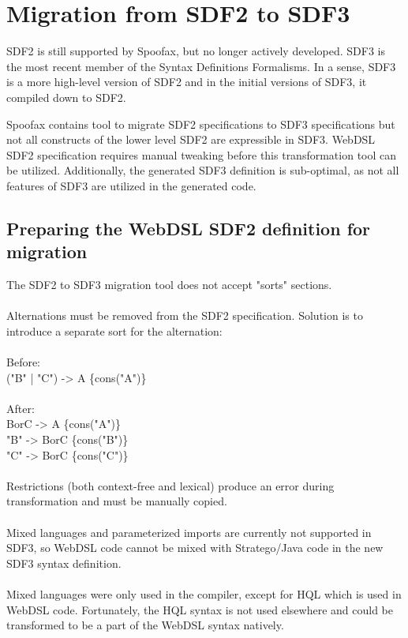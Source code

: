   \section{\label{sec:sdf2-to-sdf3}Migration from SDF2 to SDF3}

    SDF2 is still supported by Spoofax, but no longer actively developed. SDF3 is the most recent member of the Syntax Definitions Formalisms. In a sense, SDF3 is a more high-level version of SDF2 and in the initial versions of SDF3, it compiled down to SDF2.

    Spoofax contains tool to migrate SDF2 specifications to SDF3 specifications but not all constructs of the lower level SDF2 are expressible in SDF3. WebDSL SDF2 specification requires manual tweaking before this transformation tool can be utilized. Additionally, the generated SDF3 definition is sub-optimal, as not all features of SDF3 are utilized in the generated code.

    \subsection{\label{subsec:preparing-webdsl-sdf2}Preparing the WebDSL SDF2 definition for migration}

      The SDF2 to SDF3 migration tool does not accept "sorts" sections.
      \\\\Alternations must be removed from the SDF2 specification. Solution is to introduce a separate sort for the alternation:
      \\\\Before:
      \\("B" | "C") -> A \{cons("A")\}
      \\\\After:
      \\BorC -> A    \{cons("A")\}
      \\"B"  -> BorC \{cons("B")\}
      \\"C"  -> BorC \{cons("C")\}
      \\\\Restrictions (both context-free and lexical) produce an error during transformation and must be manually copied.
      \\\\Mixed languages and parameterized imports are currently not supported in SDF3, so WebDSL code cannot be mixed with Stratego/Java code in the new SDF3 syntax definition.
      \\\\Mixed languages were only used in the compiler, except for HQL which is used in WebDSL code. Fortunately, the HQL syntax is not used elsewhere and could be transformed to be a part of the WebDSL syntax natively.

